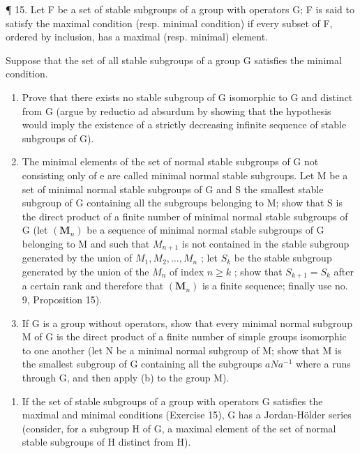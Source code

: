 ¶ 15. Let F be a set of stable subgroups of a group with operators G; F is said to satisfy the maximal condition (resp. minimal condition) if every subset of F, ordered by inclusion, has a maximal (resp. minimal) element.

Suppose that the set of all stable subgroups of a group G satisfies the minimal condition.

\begin{enumerate}
\def\labelenumi{(\alph{enumi})}
\item
  Prove that there exists no stable subgroup of G isomorphic to G and distinct from G (argue by reductio ad absurdum by showing that the hypothesis would imply the existence of a strictly decreasing infinite sequence of stable subgroups of G).
\item
  The minimal elements of the set of normal stable subgroups of G not consisting only of e are called minimal normal stable subgroups. Let M be a set of minimal normal stable subgroups of G and S the smallest stable subgroup of G containing all the subgroups belonging to M; show that S is the direct product of a finite number of minimal normal stable subgroups of G (let \((\mathbf{M}_{n})\) be a sequence of minimal normal stable subgroups of G belonging to M and such that \(M_{n+1}\) is not contained in the stable subgroup generated by the union of \(M_{1}, M_{2}, \ldots, M_{n}\) ; let \(S_{k}\) be the stable subgroup generated by the union of the \(M_{n}\) of index \(n \geqslant k\) ; show that \(S_{k+1} = S_{k}\) after a certain rank and therefore that \((\mathbf{M}_{n})\) is a finite sequence; finally use no. 9, Proposition 15).
\item
  If G is a group without operators, show that every minimal normal subgroup M of G is the direct product of a finite number of simple groups isomorphic to one another (let N be a minimal normal subgroup of M; show that M is the smallest subgroup of G containing all the subgroups \(aNa^{-1}\) where a runs through G, and then apply (b) to the group M).
\end{enumerate}

\begin{enumerate}
\def\labelenumi{\arabic{enumi}.}
\setcounter{enumi}{15}
\tightlist
\item
  If the set of stable subgroups of a group with operators G satisfies the maximal and minimal conditions (Exercise 15), G has a Jordan-Hölder series (consider, for a subgroup H of G, a maximal element of the set of normal stable subgroups of H distinct from H).
\end{enumerate}

